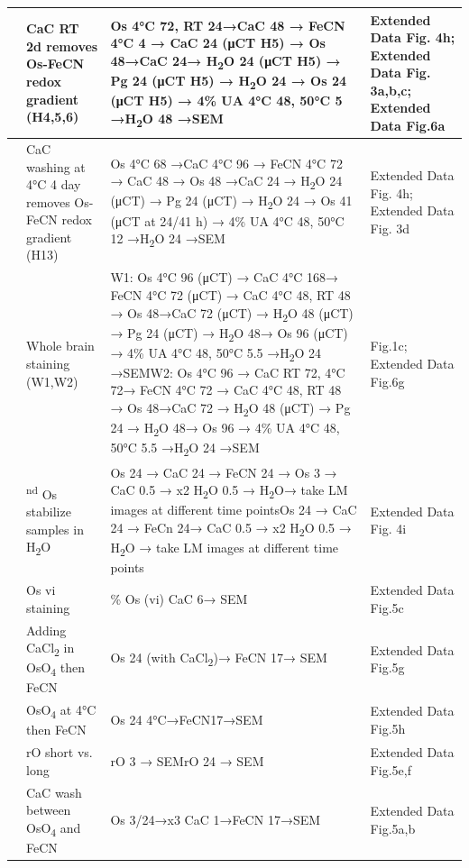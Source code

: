 \documentclass{article}
\begin{document}
\begin{longtable}{>{\raggedright\arraybackslash}p{0.6cm}>{\raggedright\arraybackslash}p{3cm}>{\raggedright\arraybackslash}p{7.3cm}>{\raggedright\arraybackslash}p{2.2cm}}
19 & CaC RT 2d removes Os-FeCN redox gradient (H4,5,6) & Os 4°C 72, RT 24→CaC 48 → FeCN 4°C 4 → CaC 24 (μCT H5) → Os 48→CaC 24→ H\textsubscript{2}O 24 (μCT H5) → Pg 24 (μCT H5) → H\textsubscript{2}O 24 → Os 24 (μCT H5) → 4\% UA 4°C 48, 50°C 5 →H\textsubscript{2}O 48 →SEM & Extended Data Fig. 4h; Extended Data Fig. 3a,b,c; Extended Data Fig.6a \\ \midrule
20 & CaC washing at 4°C 4 day removes Os-FeCN redox gradient (H13) & Os 4°C 68 →CaC 4°C 96 → FeCN 4°C 72 → CaC 48 → Os 48 →CaC 24 → H\textsubscript{2}O 24 (μCT) → Pg 24 (μCT) → H\textsubscript{2}O 24 → Os 41 (μCT at 24/41 h) → 4\% UA 4°C 48, 50°C 12 →H\textsubscript{2}O 24 →SEM & Extended Data Fig. 4h; Extended Data Fig. 3d \\ \midrule
21 & Whole brain staining (W1,W2) & W1: Os 4°C 96 (μCT) → CaC 4°C 168→ FeCN 4°C 72 (μCT) → CaC 4°C 48, RT 48 → Os 48→CaC 72 (μCT) → H\textsubscript{2}O 48 (μCT) → Pg 24 (μCT) → H\textsubscript{2}O 48→ Os 96 (μCT) → 4\% UA 4°C 48, 50°C 5.5 →H\textsubscript{2}O 24 →SEM\newline W2: Os 4°C 96 → CaC RT 72, 4°C 72→ FeCN 4°C 72 → CaC 4°C 48, RT 48 → Os 48→CaC 72 → H\textsubscript{2}O 48 (μCT) → Pg 24 → H\textsubscript{2}O 48→ Os 96 → 4\% UA 4°C 48, 50°C 5.5 →H\textsubscript{2}O 24 →SEM & Fig.1c; Extended Data Fig.6g \\ \midrule
22 & 2\textsuperscript{nd} Os stabilize samples in H\textsubscript{2}O & Os 24 → CaC 24 → FeCN 24 → Os 3 → CaC 0.5 → x2 H\textsubscript{2}O 0.5 → H\textsubscript{2}O→ take LM images at different time points\newline Os 24 → CaC 24 → FeCn 24→ CaC 0.5 → x2 H\textsubscript{2}O 0.5 → H\textsubscript{2}O → take LM images at different time points & Extended Data Fig. 4i \\ \midrule
23 & Os vi staining & 1\% Os (vi) CaC 6→ SEM & Extended Data Fig.5c \\ \midrule
24 & Adding CaCl\textsubscript{2} in OsO\textsubscript{4} then FeCN & Os 24 (with CaCl\textsubscript{2})→ FeCN 17→ SEM & Extended Data Fig.5g \\ \midrule
25 & OsO\textsubscript{4} at 4°C then FeCN & Os 24 4°C→FeCN17→SEM & Extended Data Fig.5h \\ \midrule
26 & rO short vs. long & rO 3 → SEM\newline rO 24 → SEM & Extended Data Fig.5e,f \\ \midrule
27 & CaC wash between OsO\textsubscript{4} and FeCN & Os 3/24→x3 CaC 1→FeCN 17→SEM & Extended Data Fig.5a,b \\ \midrule

\end{longtable}
\end{document}

